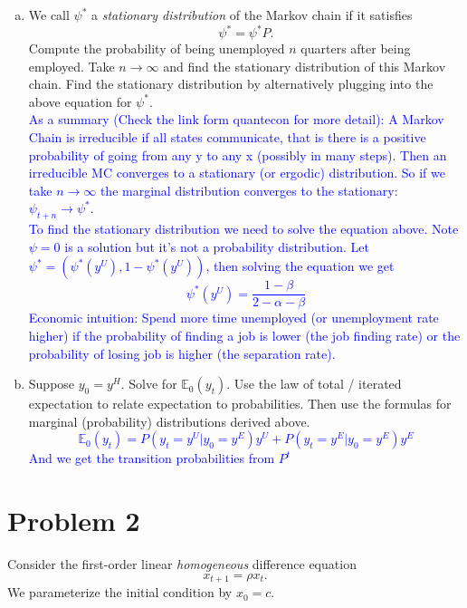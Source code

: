 \documentclass[11pt]{extarticle}
\theoremstyle{plain}
\theoremstyle{definition}
\begin{document}
\begin{enumerate}[(a)]
\item We call $\psi^*$ a \textit{stationary distribution} of the Markov chain if it satisfies 
\begin{equation*}
	\psi^* = \psi^* P.
\end{equation*}
Compute the probability of being unemployed $n$ quarters after being employed. Take $n \to \infty$ and find the stationary distribution of this Markov chain. Find the stationary distribution by alternatively plugging into the above equation for $\psi^*$. \\
\textcolor{blue}{As a summary (Check the link form quantecon for more detail): A Markov Chain is irreducible if all states communicate, that is there is a positive probability of going from any y to any x (possibly in many steps). Then an irreducible MC converges to a stationary (or ergodic) distribution. So if we take $n\rightarrow \infty$ the marginal distribution converges to the stationary: $\psi_{t+n}\rightarrow \psi^*$.\\
To find the stationary distribution we need to solve the equation above. Note $\psi =0$ is a solution but it's not a probability distribution. Let $\psi^* = (\psi^*(y^U),1-\psi^*(y^U))$, then solving the equation we get $$\psi^*(y^U)=\frac{1-\beta}{2-\alpha - \beta }$$
Economic intuition: Spend more time unemployed (or unemployment rate higher) if the probability of finding a job is lower (the job finding rate) or the probability of losing job is higher (the separation rate). }
\item Suppose $y_0 = y^H$. Solve for $\mathbb E_0 (y_t)$. Use the law of total / iterated expectation to relate expectation to probabilities. Then use the formulas for marginal (probability) distributions derived above. 
\textcolor{blue}{$$\mathbb E_0 (y_t)=P(y_t=y^U|y_0=y^E)y^U+P(y_t=y^E|y_0=y^E)y^E $$ And we get the transition probabilities from $P^t$ }
\end{enumerate}



\vspace{10mm}
\section*{Problem 2}

Consider the first-order linear \textit{homogeneous} difference equation 
\begin{equation*}
	x_{t+1} = \rho x_t.
\end{equation*}
We parameterize the initial condition by $x_0 = c$. 
\end{document}
